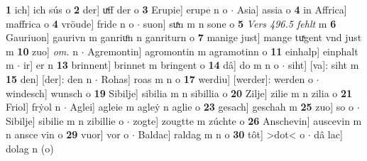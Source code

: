 \documentclass[8pt,a4paper,notitlepage]{article}
\begin{document}
\begin{table}[ht]
\begin{minipage}[t]{0.5\linewidth}
\textbf{1} ich] ich sús o \textbf{2} der] uͯff der o \textbf{3} Erupie] erupe n o  $\cdot$ Asia] assia o \textbf{4} in Affrica] maffrica o \textbf{4} vröude] fride n o  $\cdot$ suon] suͯn m n sone o \textbf{5} \textit{Vers 496.5 fehlt} m  \textbf{6} Gauriuon] gaurivn m ganriuͦn n ganriturn o \textbf{7} manige just] mange tuͯgent vnd just m \textbf{10} zuo] \textit{om.} n  $\cdot$ Agremontin] agromontin m agramotinn o \textbf{11} einhalp] einphalt m  $\cdot$ ir] er n \textbf{13} brinnent] brinnet m bringent o \textbf{14} dâ] do m n o  $\cdot$ siht] [va]: siht m \textbf{15} den] [der]: den n  $\cdot$ Rohas] roas m n o \textbf{17} werdiu] [werder]: werden o  $\cdot$ windesch] wunsch o \textbf{19} Sibilje] sibilia m n sibillia o \textbf{20} Zilje] zilie m n zilia o \textbf{21} Friol] frẏol n  $\cdot$ Aglei] agleie m agleẏ n aglie o \textbf{23} gesach] geschah m \textbf{25} zuo] so o  $\cdot$ Sibilje] sibilie m n zibillie o  $\cdot$ zogte] zougtte m zúchte o \textbf{26} Anschevin] auscevin m n ansce vin o \textbf{29} vuor] vor o  $\cdot$ Baldac] raldag m n o \textbf{30} tôt] >dot< o  $\cdot$ dâ lac] dolag n (o) \newline
\end{minipage}
\end{table}
\newpage
\end{document}
